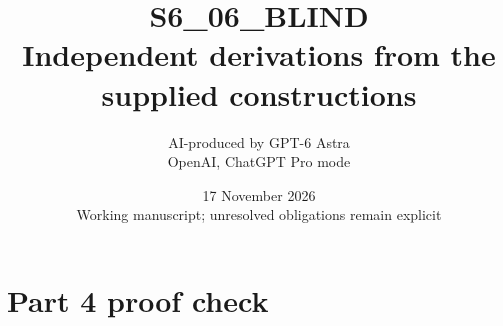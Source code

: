 \documentclass[11pt,a4paper]{article}
\title{S6\_06\_BLIND\\Independent derivations from the supplied constructions}
\author{AI-produced by GPT-6 Astra\\OpenAI, ChatGPT Pro mode}
\date{17 November 2026\\Working manuscript; unresolved obligations remain explicit}
\begin{document}
\section*{Part 4 proof check}

\end{document}
